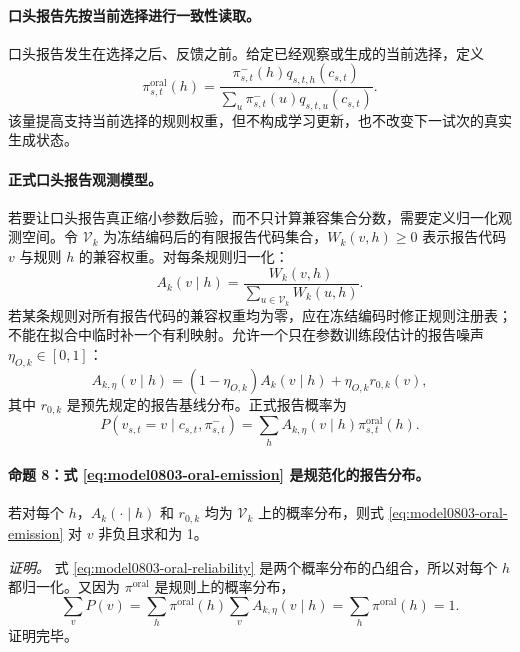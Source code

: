 \paragraph{口头报告先按当前选择进行一致性读取。}
口头报告发生在选择之后、反馈之前。给定已经观察或生成的当前选择，定义
\begin{equation}
    \pi^{\mathrm{oral}}_{s,t}(h)
    =
    \frac{\pi^-_{s,t}(h)q_{s,t,h}(c_{s,t})}
    {\sum_u\pi^-_{s,t}(u)q_{s,t,u}(c_{s,t})}.
    \label{eq:model0803-oral-belief}
\end{equation}
该量提高支持当前选择的规则权重，但不构成学习更新，也不改变下一试次的真实生成状态。

\paragraph{正式口头报告观测模型。}
若要让口头报告真正缩小参数后验，而不只计算兼容集合分数，需要定义归一化观测空间。令 $\mathcal V_k$ 为冻结编码后的有限报告代码集合，$W_k(v,h)\geq0$ 表示报告代码 $v$ 与规则 $h$ 的兼容权重。对每条规则归一化：
\begin{equation}
    A_k(v\mid h)
    =\frac{W_k(v,h)}
    {\sum_{u\in\mathcal V_k}W_k(u,h)}.
    \label{eq:model0803-oral-mapping}
\end{equation}
若某条规则对所有报告代码的兼容权重均为零，应在冻结编码时修正规则注册表；不能在拟合中临时补一个有利映射。允许一个只在参数训练段估计的报告噪声 $\eta_{O,k}\in[0,1]$：
\begin{equation}
    A_{k,\eta}(v\mid h)
    =(1-\eta_{O,k})A_k(v\mid h)
      +\eta_{O,k}r_{0,k}(v),
    \label{eq:model0803-oral-reliability}
\end{equation}
其中 $r_{0,k}$ 是预先规定的报告基线分布。正式报告概率为
\begin{equation}
    P(v_{s,t}=v\mid c_{s,t},\pi^-_{s,t})
    =\sum_h A_{k,\eta}(v\mid h)
      \pi^{\mathrm{oral}}_{s,t}(h).
    \label{eq:model0803-oral-emission}
\end{equation}

\paragraph{命题 8：式 \ref{eq:model0803-oral-emission} 是规范化的报告分布。}
若对每个 $h$，$A_k(\cdot\mid h)$ 和 $r_{0,k}$ 均为 $\mathcal V_k$ 上的概率分布，则式 \ref{eq:model0803-oral-emission} 对 $v$ 非负且求和为 1。

\textit{证明。}
式 \ref{eq:model0803-oral-reliability} 是两个概率分布的凸组合，所以对每个 $h$ 都归一化。又因为 $\pi^{\mathrm{oral}}$ 是规则上的概率分布，
\begin{equation}
    \sum_vP(v)
    =\sum_h\pi^{\mathrm{oral}}(h)
      \sum_vA_{k,\eta}(v\mid h)
    =\sum_h\pi^{\mathrm{oral}}(h)=1.
\end{equation}
证明完毕。

